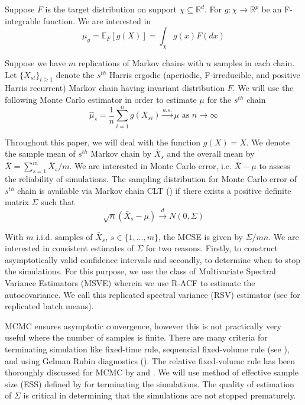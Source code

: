 \documentclass[12pt]{article}
\theoremstyle{remark}
\begin{document}
Suppose $F$ is the target distribution on support $\chi \subseteq \mathbb{R}^d$. For $g:\chi \longrightarrow \mathbb{R}^p$ be an F-integrable function. We are interested in
%
\[
\mu_g = \mathbb{E}_F[g(X)] = \int_{\chi}g(x)F(dx)
\]

Suppose we have $m$ replications of Markov chains with $n$ samples in each chain. Let $\{X_{st}\}_{t \geq 1}$ denote the $s^{th}$ Harris ergodic (aperiodic, F-irreducible, and positive Harris recurrent) Markov chain having invariant distribution $F$. We will use the following Monte Carlo estimator in order to estimate $\mu$ for the $s^{th}$ chain
%
\[
\hat{\mu}_s = \dfrac{1}{n}\sum_{i = 1}^{n} g(X_{si}) \xrightarrow{a.s.} \mu \textrm{ as } n \to \infty
\]

Throughout this paper, we will deal with the function $g(X) = X$. We denote the sample mean of $s^{th}$ Markov chain by $\bar{X}_s$ and the overall mean by $\bar{\bar{X}} = \sum_{s = 1}^{m}\bar{X}_s/m$. We are interested in Monte Carlo error, i.e. $\bar{\bar{X}} - \mu$ to assess the reliability of simulations. The sampling distribution for Monte Carlo error of $s^{th}$ chain is available via Markov chain CLT (\cite{jones2004markov}) if there exists a positive definite matrix $\Sigma$ such that
%
\[
\sqrt{n}(\bar{X}_s-\mu) \xrightarrow{d} N(0,\Sigma)
\]

 With $m$ i.i.d. samples of $\bar{X}_s$, $s \in \{1,..., m\}$, the MCSE is given by $\Sigma/mn$. We are interested in consistent estimates of $\Sigma$ for two reasons. Firstly, to construct asymptotically valid confidence intervals and secondly, to determine when to stop the simulations. For this purpose, we use the class of Multivariate Spectral Variance Estimators (MSVE) wherein we use R-ACF to estimate the autocovariance. We call this replicated spectral variance (RSV) estimator (see \cite{arg:and:2006} for replicated batch means). 
 
MCMC ensures asymptotic convergence, however this is not practically very useful where the number of samples is finite. There are many criteria for terminating simulation like fixed-time rule, sequencial fixed-volume rule (see \cite{glynn1992asymptotic}), and using Gelman Rubin diagnostics (\cite{gelman1992inference}). The relative fixed-volume rule has been thoroughly discussed for MCMC by \cite{flegal2015relative} and \cite{gong2016practical}. We will use method of effective sample size (ESS) defined by \cite{vats2019multivariate} for terminating the simulations. The quality of estimation of $\Sigma$ is critical in determining that the simulations are not stopped prematurely. 
 
\end{document}
